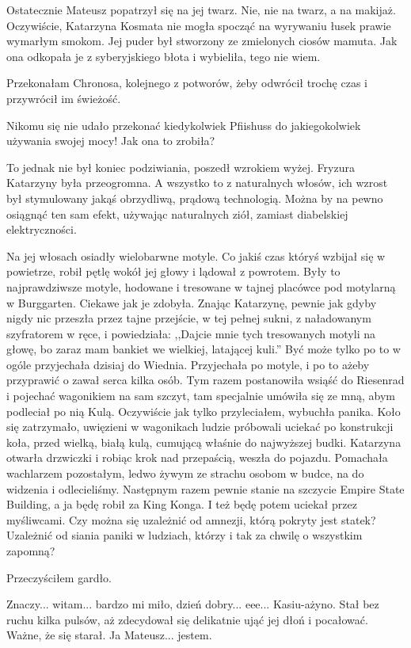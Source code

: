 Ostatecznie Mateusz popatrzył się na jej twarz.
Nie, nie na twarz, a na makijaż.
Oczywiście, Katarzyna Kosmata nie mogła spocząć na wyrywaniu łusek prawie wymarłym smokom.
Jej puder był stworzony ze zmielonych ciosów mamuta.
Jak ona odkopała je z syberyjskiego błota i wybieliła, tego nie wiem.

\ds{} Przekonałam Chronosa, kolejnego z potworów, żeby odwrócił trochę czas i przywrócił im świeżość. \de{}

Nikomu się nie udało przekonać kiedykolwiek Pfiishuss do jakiegokolwiek używania swojej mocy! Jak ona to zrobiła?

To jednak nie był koniec podziwiania, poszedł wzrokiem wyżej.
Fryzura Katarzyny była przeogromna. A wszystko to z naturalnych włosów, ich wzrost był stymulowany jakąś obrzydliwą, prądową technologią.
Można by na pewno osiągnąć ten sam efekt, używając naturalnych ziół, zamiast diabelskiej elektryczności.

Na jej włosach osiadły wielobarwne motyle. Co jakiś czas któryś wzbijał się w powietrze, robił pętlę wokół jej głowy i lądował z powrotem.
Były to najprawdziwsze motyle, hodowane i tresowane w tajnej placówce pod motylarną w Burggarten.
Ciekawe jak je zdobyła. Znając Katarzynę, pewnie jak gdyby nigdy nic przeszła przez tajne przejście, w tej pełnej sukni, z naładowanym szyfratorem w ręce, i powiedziała:
,,Dajcie mnie tych tresowanych motyli na głowę, bo zaraz mam bankiet we wielkiej, latającej kuli.''
Być może tylko po to w ogóle przyjechała dzisiaj do Wiednia.
Przyjechała po motyle, i po to ażeby przyprawić o zawał serca kilka osób.
Tym razem postanowiła wsiąść do Riesenrad i pojechać wagonikiem na sam szczyt, tam specjalnie umówiła się ze mną, abym podleciał po nią Kulą.
Oczywiście jak tylko przyleciałem, wybuchła panika. Koło się zatrzymało, uwięzieni w wagonikach ludzie próbowali uciekać po konstrukcji koła, 
przed wielką, białą kulą, cumującą właśnie do najwyższej budki. Katarzyna otwarła drzwiczki i robiąc krok nad przepaścią, weszła do pojazdu.
Pomachała wachlarzem pozostałym, ledwo żywym ze strachu osobom w budce, na do widzenia i odlecieliśmy.
Następnym razem pewnie stanie na szczycie Empire State Building, a ja będę robił za King Konga.
I też będę potem uciekał przez myśliwcami.
Czy można się uzależnić od amnezji, którą pokryty jest statek?
Uzależnić od siania paniki w ludziach, którzy i tak za chwilę o wszystkim zapomną?

Przeczyściłem gardło.

\ds{} Znaczy... witam... bardzo mi miło, dzień dobry... eee... Kasiu-ażyno. \dm{} Stał bez ruchu kilka pulsów, aż zdecydował się delikatnie ująć jej dłoń i pocałować.
Ważne, że się starał. \dm{} Ja Mateusz... jestem. \de{}

